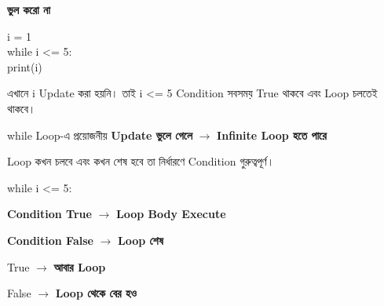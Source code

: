 \begin{rememberbox}

\textbf{\color{deepOrange}ভুল করো না}

\begin{codebox}
\begin{english}
\ttfamily
i = 1\\
while i <= 5:\\
\hspace*{4mm}print(i)
\end{english}
\end{codebox}

এখানে
\textenglish{\ttfamily i}
Update করা হয়নি। তাই
\textenglish{\ttfamily i <= 5}
Condition সবসময় True থাকবে এবং Loop চলতেই থাকবে।

\begin{center}

\textenglish{\ttfamily while}
Loop-এ প্রয়োজনীয়
\textbf{Update ভুলে গেলে}
\(\longrightarrow\)
\textbf{Infinite Loop হতে পারে}

\end{center}

\end{rememberbox}



Loop কখন চলবে এবং কখন শেষ হবে তা নির্ধারণে Condition গুরুত্বপূর্ণ।

\begin{codebox}
\begin{english}
\ttfamily
while i <= 5:
\end{english}
\end{codebox}

\begin{center}

\textbf{Condition True}
\(\longrightarrow\)
\textbf{Loop Body Execute}

\qquad

\textbf{Condition False}
\(\longrightarrow\)
\textbf{Loop শেষ}

\end{center}

\begin{rememberbox}

\begin{center}

\textenglish{\ttfamily True}
\(\longrightarrow\)
\textbf{আবার Loop}

\qquad

\textenglish{\ttfamily False}
\(\longrightarrow\)
\textbf{Loop থেকে বের হও}

\end{center}

\end{rememberbox}

